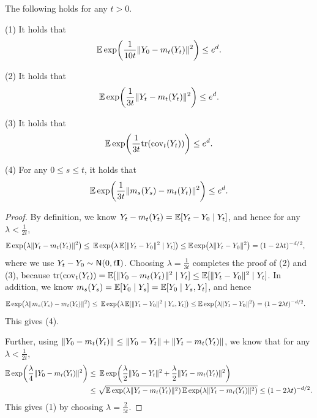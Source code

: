 \begin{lemma}\label{lem:MGF-trivial}
The following holds for any $t>0$.

(1) It holds that
\begin{align*}
\En\exp\prn*{ \frac{1}{10t}\nrm{Y_0-m_t(Y_t)}^2 }
    \leq e^d.
\end{align*}

(2) It holds that
\begin{align*}
    \En\exp\prn*{ \frac{1}{3t}\nrm{Y_t-m_t(Y_t)}^2 }
    \leq e^d.
\end{align*}

(3) It holds that
\begin{align*}
    \En\exp\prn*{ \frac{1}{3t}\tr(\cov_t(Y_t)) }
    \leq e^d.
\end{align*}

(4) For any $0\leq s\leq t$, it holds that
\begin{align*}
    \En\exp\prn*{ \frac{1}{3t}\nrm{m_s(Y_s)-m_t(Y_t)}^2 }
    \leq e^d.
\end{align*}
\end{lemma}

\begin{proof}
By definition, we know $Y_t-m_t(Y_t)=\operatorname{\mathbb{E}}[Y_t-Y_0\mid Y_t]$, and hence for any $\lambda<\frac{1}{2t}$,
\begin{align*}
    \En\exp\prn*{ \lambda\nrm{Y_t-m_t(Y_t)}^2 }
    \leq&~ \En\exp\prn*{ \lambda\En[\nrm{Y_t-Y_0}^2\mid Y_t] }
    \leq \En\exp\prn*{\lambda\nrm{Y_t-Y_0}^2}=(1-2\lambda t)^{-d/2},
\end{align*}
where we use $Y_t-Y_0\sim \normal{0,t\Id}$. Choosing $\lambda=\frac{1}{3t}$ completes the proof of (2) and (3), because $\mathrm{tr}(\mathrm{cov}_t(Y_t))=\operatorname{\mathbb{E}}[\lVert Y_0-m_t(Y_t)\rVert^2\mid Y_t]\leq \operatorname{\mathbb{E}}[\lVert Y_t-Y_0\rVert^2\mid Y_t]$. In addition, we know $m_s(Y_s)=\operatorname{\mathbb{E}}[Y_0\mid Y_s]=\operatorname{\mathbb{E}}[Y_0\mid Y_s,Y_t]$, and hence
\begin{align}\label{eq:MGF-finiteness}
    \En\exp\prn*{ \lambda\nrm{m_s(Y_s)-m_t(Y_t)}^2 }
    \leq&~ \En\exp\prn*{ \lambda\En[\nrm{Y_t-Y_0}^2\mid Y_s,Y_t] }
    \leq \En\exp\prn*{\lambda\nrm{Y_t-Y_0}^2}=(1-2\lambda t)^{-d/2}.
\end{align}
This gives (4).

Further, using $\lVert Y_0-m_t(Y_t)\rVert\leq \lVert Y_0-Y_t\rVert+\lVert Y_t-m_t(Y_t)\rVert$, we know that for any $\lambda<\frac{1}{2t}$,
\begin{align*}
    \En\exp\prn*{ \frac{\lambda}{4}\nrm{Y_0-m_t(Y_t)}^2 }
    \leq&~ \En\exp\prn*{ \frac{\lambda}{2}\nrm{Y_0-Y_t}^2+\frac{\lambda}{2}\nrm{Y_t-m_t(Y_t)}^2 } \\
    \leq&~ \sqrt{\En\exp\prn*{ \lambda\nrm{Y_t-m_t(Y_t)}^2 }\En\exp\prn*{ \lambda\nrm{Y_t-m_t(Y_t)}^2 }}
    \leq (1-2\lambda t)^{-d/2}.
\end{align*}
This gives (1) by choosing $\lambda=\frac{2}{5t}$. 
\end{proof}




